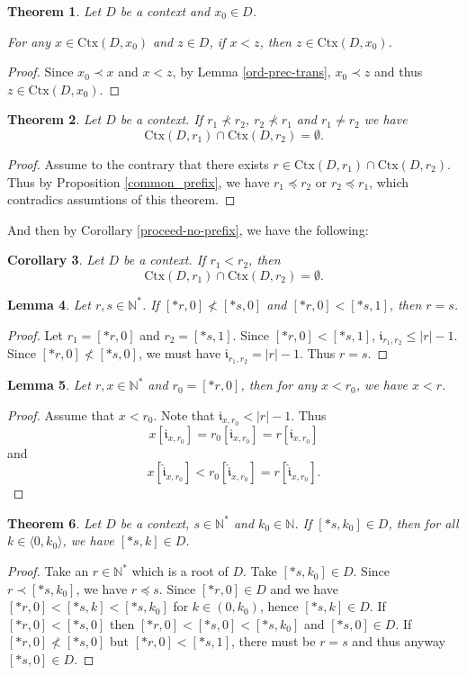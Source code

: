 \documentclass[10pt]{article}
\theoremstyle{plain}
\newtheorem{theorem}{Theorem}[section]
\newtheorem{corollary}[theorem]{Corollary}
\newtheorem{lemma}[theorem]{Lemma}
\renewcommand{\i}{\mathfrak{i}}
\newcommand{\ii}{\hat{\mathfrak{i}}}
\newcommand{\N}{\mathbb{N}}
\newcommand{\context}{\text{Ctx}}
\begin{document}
\begin{theorem}
Let $D$ be a context and $x_0\in D$.

For any $x\in\context(D, x_0)$ and $z\in D$, if $x < z$, then $z\in \context(D, x_0)$.  
\end{theorem}
\begin{proof}
Since $x_0 \prec x$ and $x < z$, by Lemma \ref{ord-prec-trans}, $x_0 \prec z$ and
thus $z\in \context(D, x_0)$. 
\end{proof}

\begin{theorem}
Let $D$ be a context.
If $r_1\not\prec r_2$, $r_2\not\prec r_1$ and $r_1\not=r_2$ we have
$$
\context(D, r_1) \cap \context(D, r_2) = \emptyset.
$$
\end{theorem}
\begin{proof}
Assume to the contrary that there exists $r\in \context(D, r_1) \cap \context(D, r_2)$. Thus by Proposition \ref{common_prefix}, we have $r_1\preceq r_2$ or $r_2\preceq r_1$, which contradics assumtions of this theorem. 
\end{proof}

And then by Corollary \ref{proceed-no-prefix}, we have the following:

\begin{corollary}
Let $D$ be a context. If $r_1 < r_2$, then
$$
\context(D, r_1) \cap \context(D, r_2) = \emptyset.
$$
\end{corollary}

\begin{lemma}
Let $r, s\in\N^*$. If $[*r, 0]\not< [*s, 0]$ and $[*r, 0] < [*s, 1]$, then $r = s$.
\end{lemma}
\begin{proof}
Let $r_1 = [*r, 0]$ and $r_2 = [*s, 1]$. Since $[*r, 0] < [*s, 1]$, 
$\i_{r_1, r_2} \leq |r| - 1$. 
Since $[*r, 0]\not< [*s, 0]$, we must have $\i_{r_1, r_2} = |r| - 1$. Thus $r = s$.
\end{proof}

\begin{lemma}
\label{minimal-shift}
Let $r, x\in \N^*$ and $r_0 = [*r, 0]$, then for any $x < r_0$, we have $x < r$.
\end{lemma}
\begin{proof}
Assume that $x < r_0$.
Note that $\i_{x, r_0} < |r| - 1$. Thus 
$$x[\i_{x, r_0}] = r_0[\i_{x, r_0}] = r[\i_{x, r_0}]$$ 
and  
$$x[\ii_{x, r_0}] < r_0[\ii_{x, r_0}] = r[\ii_{x, r_0}].$$
\end{proof}

\begin{theorem}
Let $D$ be a context, $s\in\N^*$ and $k_0\in\N$. If $[*s, k_0]\in D$, then for
all $k \in \langle 0, k_0 \rangle$, we have $[*s,k]\in D$.
\end{theorem}
\begin{proof}
Take an $r\in\N^*$ which is a root of $D$. Take $[*s, k_0]\in D$.
Since $r\prec [*s, k_0]$, we have $r\preceq s$.
Since $[*r, 0]\in D$ and we have $[*r, 0] < [*s, k] < [*s, k_0]$ for $k \in (0, k_0)$, hence $[*s, k]\in D$. If $[*r, 0] < [*s,0]$ then $[*r, 0] < [*s,0] < [*s, k_0]$ and $[*s, 0]\in D$.
If $[*r, 0] \not< [*s,0]$ but $[*r, 0] < [*s,1]$, there must be $r=s$ and thus anyway $[*s,0]\in D$. 
\end{proof}
\end{document}
